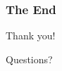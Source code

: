 \documentclass{beamer}
\begin{document}
\begin{frame}
\frametitle{The End}
Thank you!
	
Questions?
\end{frame}






\end{document}
